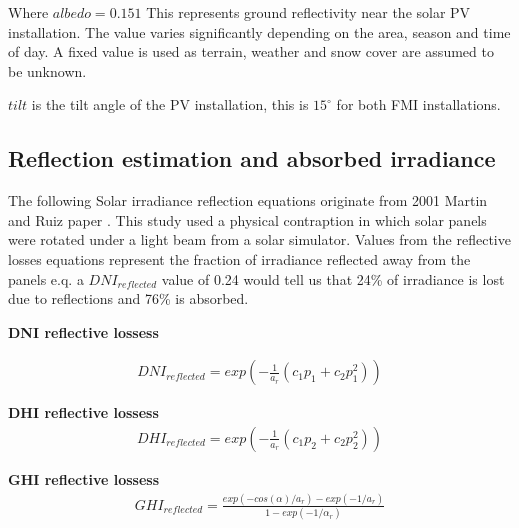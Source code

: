 \noindent Where
\noindent $albedo = 0.151$ This represents ground reflectivity near the solar PV installation. The value varies significantly depending on the area, season and time of day. A fixed value is used as terrain, weather and snow cover are assumed to be unknown.

\noindent $tilt$ is the tilt angle of the PV installation, this is $15^\circ$ for both FMI installations.


\newpage
\subsection{Reflection estimation and absorbed irradiance}
The following Solar irradiance reflection equations originate from 2001 Martin and Ruiz paper \cite{solar_reflections}. This study used a physical contraption in which solar panels were rotated under a light beam from a solar simulator. Values from the reflective losses equations represent the fraction of irradiance reflected away from the panels e.q. a $DNI_{reflected}$ value of 0.24 would tell us that 24\% of irradiance is lost due to reflections and 76\% is absorbed. 

\noindent\textbf{DNI reflective lossess}

\begin{equation} 
\begin{split}
\label{solar_reflecive_dni_loss} 
DNI_{reflected}= exp(-\frac{1}{a_r}(c_1 p_1 +c_2 p_1^2))
\end{split}
\end{equation}


\noindent\textbf{DHI reflective lossess}
%
\begin{equation}
\begin{split}
\label{solar_reflecive_dhi_loss}
DHI_{reflected}= exp(-\frac{1}{a_r}(c_1 p_2 +c_2 p_2^2))
\end{split}
\end{equation}

\noindent\textbf{GHI reflective lossess}
%
\begin{equation}
\begin{split}
\label{solar_reflecive_ghi_loss}
GHI_{reflected} = \frac{exp(-cos(\alpha)/a_r)- exp(-1/a_r)}{1-exp(-1/\alpha_r)}
\end{split}
\end{equation}

